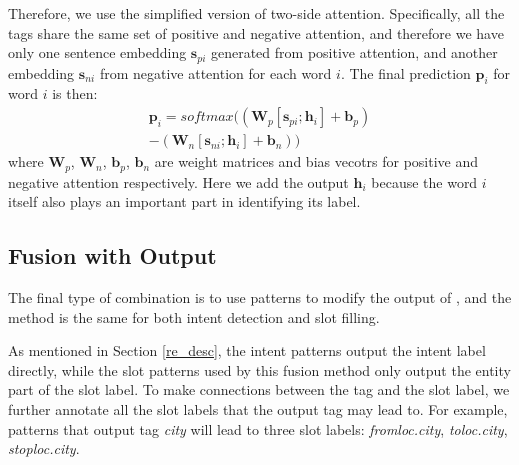 Therefore, we use the simplified version of two-side attention. Specifically, all the tags share the same set of positive and negative attention, and therefore we have only one sentence embedding $\textbf{s}_{pi}$ generated from positive attention, and another embedding $\textbf{s}_{ni}$ from negative attention for each word $i$. The final prediction $\textbf{p}_i$ for word $i$ is then:
\begin{equation}
\begin{split}
\textbf{p}_i = softmax((\textbf{W}_p [\textbf{s}_{pi}; \textbf{h}_i] + \textbf{b}_p) \\- (\textbf{W}_n [\textbf{s}_{ni}; \textbf{h}_i] + \textbf{b}_n))
\end{split} 
\end{equation} 
where $\textbf{W}_{p}$, $\textbf{W}_{n}$, $\textbf{b}_{p}$, $\textbf{b}_{n}$ are weight matrices and bias vecotrs for positive and negative attention respectively. Here we add the \BLSTM output $\textbf{h}_i$ because the word $i$ itself also plays an important part in identifying its label.

\subsection{Fusion with Output}
\label{fusion_with_output}
The final type of combination is to use \RE patterns to modify the output of \NN, and the method is the same for both intent detection and slot filling. 

As mentioned in Section \ref{re_desc}, the intent \RE patterns output the intent label directly, while the slot \RE patterns used by this fusion method only output the entity part of the slot label. To make connections between the \RE tag and the slot label, we further annotate all the slot labels that the output tag may lead to. For example, patterns that output tag \emph{city} will lead to three slot labels: \emph{fromloc.city}, \emph{toloc.city}, \emph{stoploc.city}.

